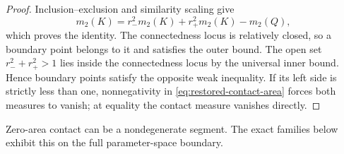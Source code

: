 \begin{proof}
Inclusion--exclusion and similarity scaling give
\[
 m_2(K)=r_-^2m_2(K)+r_+^2m_2(K)-m_2(Q),
\]
which proves the identity. The connectedness locus is relatively
closed, so a boundary point belongs to it and satisfies the outer
bound. The open set $r_-^2+r_+^2>1$ lies inside the connectedness locus
by the universal inner bound. Hence boundary points satisfy the
opposite weak inequality. If its left side is strictly less than
one, nonnegativity in \eqref{eq:restored-contact-area} forces both
measures to vanish; at equality the contact measure vanishes directly.
\end{proof}

Zero-area contact can be a nondegenerate segment. The exact families
below exhibit this on the full parameter-space boundary.
